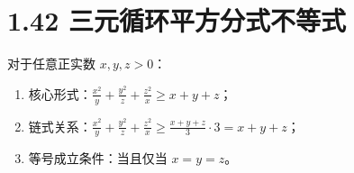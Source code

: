 \documentclass{article}
\begin{document}
\section*{1.42 三元循环平方分式不等式}
对于任意正实数 \( x, y, z > 0 \)：
\begin{enumerate}
    \item 核心形式：\( \frac{x^2}{y} + \frac{y^2}{z} + \frac{z^2}{x} \geq x + y + z \)；
    \item 链式关系：\( \frac{x^2}{y} + \frac{y^2}{z} + \frac{z^2}{x} \geq \frac{x+y+z}{3} \cdot 3 = x+y+z \)；
    \item 等号成立条件：当且仅当 \( x = y = z \)。
\end{enumerate}
\end{document}
